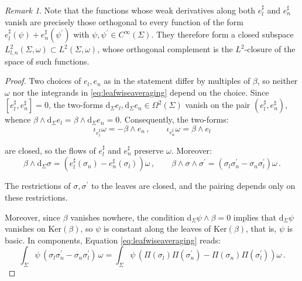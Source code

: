 \documentclass[10pt,reqno,a4paper]{amsart}
\theoremstyle{plain}
\theoremstyle{definition}
\theoremstyle{remark}
\newtheorem{remark}[thm]{Remark}
\theoremstyle{remark}
\def\dd{\mathrm{d}}
\renewcommand{\(}{ (}
\renewcommand{\)}{ )}
\begin{document}
\begin{remark}
Note that the functions whose weak derivatives along both $e^{\sharp}_l$ and $e^{\sharp}_n$ vanish are precisely those orthogonal to every function of the form $e^{\sharp}_l(\psi)+e^{\sharp}_n(\psi^{\prime})$ with $\psi,\psi^{\prime}\in C^{\infty}(\Sigma)$. They therefore form a closed subspace $L^2_{l,n}(\Sigma,\omega)\subset L^2(\Sigma,\omega)$, whose orthogonal complement is the $L^2$-closure of the space of such functions.
\end{remark}

\begin{proof}
Two choices of $e_l,e_n$ as in the statement differ by multiples of $\beta$, so neither $\omega$ nor the integrands in \eqref{eq:leafwiseaveraging} depend on the choice. Since $[e^{\sharp}_l,e^{\sharp}_n]=0$, the two-forms $\dd_{\Sigma}e_l , \dd_{\Sigma}e_n \in \Omega^2(\Sigma)$ vanish on the pair $(e^{\sharp}_l,e^{\sharp}_n)$, whence $\beta \wedge \dd_{\Sigma}e_l = \beta \wedge \dd_{\Sigma}e_n=0$. Consequently, the two-forms:
\begin{equation*}
\iota_{e^{\sharp}_l}\omega = -\beta\wedge e_n \, , \qquad \iota_{e^{\sharp}_n}\omega = \beta\wedge e_l 
\end{equation*}

\noindent
are closed, so the flows of $e^{\sharp}_l$ and $e^{\sharp}_n$ preserve $\omega$. Moreover:
	\begin{equation*}
		\beta\wedge\dd_{\Sigma}\sigma= (e^{\sharp}_l(\sigma_n)-e^{\sharp}_n(\sigma_l) )\omega\, ,
		\qquad
		\beta\wedge\sigma\wedge\sigma^{\prime}= (\sigma_l\sigma^{\prime}_n-\sigma_n\sigma^{\prime}_l )\omega\, .
	\end{equation*}
	
	\noindent
	The restrictions of $\sigma,\sigma^{\prime}$ to the leaves are closed, and the pairing depends only on these restrictions. 
    
    
    Moreover, since $\beta$ vanishes nowhere, the condition $\dd _\Sigma \psi \wedge \beta = 0$ implies that $\dd _\Sigma \psi$ vanishes on $\mathrm{Ker}(\beta)$, so $\psi$ is constant along the leaves of $\mathrm{Ker}(\beta)$, that is, $\psi$ is basic. In components, Equation \eqref{eq:leafwiseaveraging} reads:
	\begin{equation*}
		\int_{\Sigma}\psi\,(\sigma_l\sigma^{\prime}_n-\sigma_n\sigma^{\prime}_l)\,\omega
		=\int_{\Sigma}\psi\, (\Pi(\sigma_l)\Pi(\sigma^{\prime}_n)-\Pi(\sigma_n)\Pi(\sigma^{\prime}_l) )\omega\, .
	\end{equation*}


\end{proof}
\end{document}

